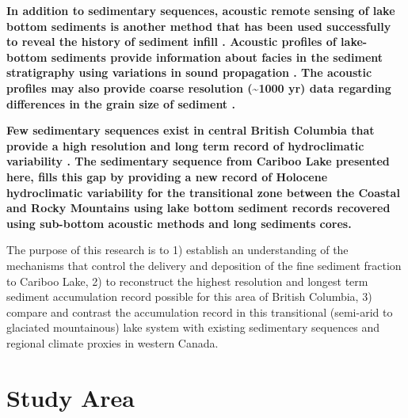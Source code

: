 \documentclass[Royal,times,doublespace,sageh]{sagej}
\begin{document}
\textbf{In addition to sedimentary sequences, acoustic remote sensing of
lake bottom sediments is another method that has been used successfully
to reveal the history of sediment infill
\citep{Desloges1994d, Hodder2006b, Gilbert2012, VanRensbergen1999}.
Acoustic profiles of lake-bottom sediments provide information about
facies in the sediment stratigraphy using variations in sound
propagation \citep{LeBlanc1992}. The acoustic profiles may also provide
coarse resolution (\textasciitilde1000 yr) data regarding differences in
the grain size of sediment \citep[e.g.~strong acoustic reflectors
correlated to an energetic sedimentary environment in][]{Hodder2006b}.}

\textbf{Few sedimentary sequences exist in central British Columbia that
provide a high resolution and long term record of hydroclimatic
variability \citep{Gilbert2012, Hodder2006b}. The sedimentary sequence
from Cariboo Lake presented here, fills this gap by providing a new
record of Holocene hydroclimatic variability for the transitional zone
between the Coastal and Rocky Mountains using lake bottom sediment
records recovered using sub-bottom acoustic methods and long sediments
cores.}

The purpose of this research is to 1) establish an understanding of the
mechanisms that control the delivery and deposition of the fine sediment
fraction to Cariboo Lake, 2) to reconstruct the highest resolution and
longest term sediment accumulation record possible for this area of
British Columbia, 3) compare and contrast the accumulation record in
this transitional (semi-arid to glaciated mountainous) lake system with
existing sedimentary sequences and regional climate proxies in western
Canada.

\hypertarget{study-area}{%
\section{Study Area}\label{study-area}}
\end{document}
